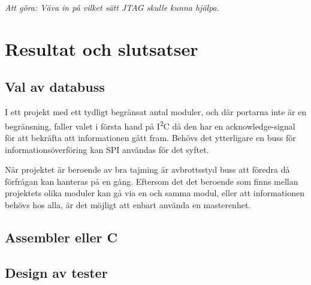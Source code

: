 \documentclass[11pt]{article}
\begin{document}
\begin{flushleft}
\textit{Att göra: Väva in på vilket sätt JTAG skulle kunna hjälpa.}

\pagebreak

\section{Resultat och slutsatser}

\subsection{Val av databuss}
I ett projekt med ett tydligt begränsat antal moduler, och där portarna inte är en begränsning, faller valet i första hand på I\textsuperscript{2}C då den har en acknowledge-signal för att bekräfta att informationen gått fram. Behövs det ytterligare en buss för informationsöverföring kan SPI användas för det syftet.

När projektet är beroende av bra tajming är avbrottsstyd buss att föredra då förfrågan kan hanteras på en gång. Eftersom det det beroende som finns mellan projektets olika moduler kan gå via en och samma modul, eller att informationen behövs hos alla, är det möjligt att enbart använda en masterenhet.

\subsection{Assembler eller C}

\subsection{Design av tester}

\pagebreak
{}




\end{flushleft}
\end{document}
